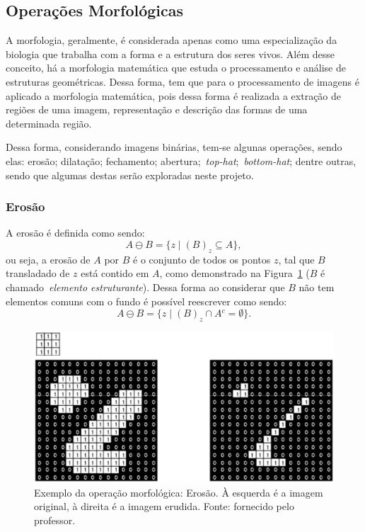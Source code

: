 \documentclass[conference]{Trabalho_Final}
\begin{document}
\subsection{Opera\c{c}\~oes Morfol\'ogicas}
  \label{subsec:morfo}
A morfologia, geralmente, \'e considerada apenas como uma especializa\c{c}\~ao da biologia que trabalha com a forma e a estrutura dos seres vivos. Al\'em desse conceito, h\'a a morfologia matem\'atica que estuda o processamento e an\'alise de estruturas geom\'etricas. Dessa forma, tem que para o processamento de imagens \'e aplicado a morfologia matem\'atica, pois dessa forma \'e realizada a extra\c{c}\~ao de regi\~oes de uma imagem, representa\c{c}\~ao e descri\c{c}\~ao das formas de uma determinada regi\~ao.

Dessa forma, considerando imagens bin\'arias, tem-se algunas opera\c{c}\~oes, sendo elas: eros\~ao; dilata\c{c}\~ao; fechamento; abertura;~\textit{top-hat};~\textit{bottom-hat}; dentre outras, sendo que algumas destas ser\~ao exploradas neste projeto.

\subsubsection{Eros\~ao}
  \label{subsubsec:erosao}
A eros\~ao \'e definida como sendo:
$$ A \ominus B  = \{z \mid (B)_z \subseteq A\},$$
ou seja, a eros\~ao de $A$ por $B$ \'e o conjunto de todos os pontos $z$, tal que $B$ transladado de $z$ est\'a contido em $A$, como demonstrado na Figura~\ref{fig:erosao} ($B$ \'e chamado~\textit{elemento estruturante}). Dessa forma ao considerar que $B$ n\~ao tem elementos comuns com o fundo \'e poss\'ivel reescrever como sendo:
$$ A \ominus B  = \{z \mid (B)_z \cap A{^c} = \emptyset \}.$$

\begin{figure}[]
  \centering
  \includegraphics[width = 5 cm]{Erosao}
  \caption{Exemplo da opera\c{c}\~ao morfol\'ogica: Eros\~ao. \`A esquerda \'e a imagem original, \`a direita \'e a imagem erudida. Fonte: fornecido pelo professor.}
  \label{fig:erosao}
\end{figure}
\end{document}
